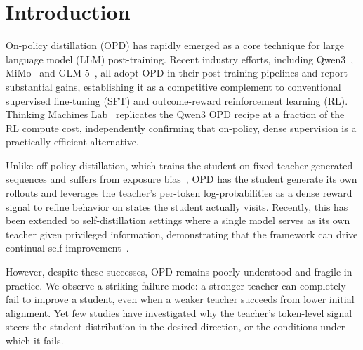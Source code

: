 \section{Introduction}

On-policy distillation (OPD) has rapidly emerged as a core technique for large language model (LLM) post-training.
Recent industry efforts, including Qwen3~\citep{yang2025qwen3}, MiMo~\citep{xiao2026mimo} and GLM-5~\citep{zeng2026glm}, all adopt OPD in their post-training pipelines and report substantial gains, establishing it as a competitive complement to conventional supervised fine-tuning (SFT) and outcome-reward reinforcement learning (RL).
Thinking Machines Lab~\citep{lu2025onpolicydistillation} replicates the Qwen3 OPD recipe at a fraction of the RL compute cost, independently confirming that on-policy, dense supervision is a practically efficient alternative.

Unlike off-policy distillation, which trains the student on fixed teacher-generated sequences and suffers from exposure bias~\citep{bengio2015scheduled}, OPD has the student generate its own rollouts and leverages the teacher's per-token log-probabilities as a dense reward signal to refine behavior on states the student actually visits.
Recently, this has been extended to self-distillation settings where a single model serves as its own teacher given privileged information, demonstrating that the framework can drive continual self-improvement~\citep{hubotter2026reinforcement,zhao2026self,shenfeld2026self}.

However, despite these successes, OPD remains poorly understood and fragile in practice.
We observe a striking failure mode: a stronger teacher can completely fail to improve a student, even when a weaker teacher succeeds from lower initial alignment.
Yet few studies have investigated why the teacher's token-level signal steers the student distribution in the desired direction, or the conditions under which it fails.



